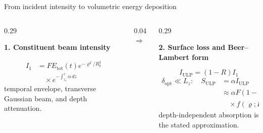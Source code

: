 \documentclass[aspectratio=169,10pt]{beamer}
\begin{document}
\begin{frame}[t]{From incident intensity to volumetric energy deposition}
  \hypertarget{supp:physics-source-hierarchy}{}
  \vspace{-0.12cm}\hspace{0.65cm}
  \hspace{0.10cm}\GVBackupIndexButton
  \vspace{0.02cm}
  \begin{columns}[T,onlytextwidth]
    \setlength{\columnsep}{0pt}
    \begin{column}{0.29\textwidth}
      \raggedright\scriptsize\textbf{\color{GVSourceBlue}1. Constituent beam intensity}\par
      \vspace{0.11cm}
      \[
      \begin{aligned}
      I_1&=F E_{\mathrm{tot}}(t)e^{-\varrho^2/R_0^2}\\[-0.05cm]
      &\quad\times e^{-\int_{z_s}^{z}\alpha\,dz}
      \end{aligned}
      \]
      \vspace{-0.11cm}
      \scriptsize temporal envelope, transverse Gaussian beam, and depth attenuation.
    \end{column}
    \begin{column}{0.04\textwidth}
      \centering\vspace{0.82cm}\textcolor{GVTeal}{\(\Longrightarrow\)}
    \end{column}
    \begin{column}{0.29\textwidth}
      \raggedright\scriptsize\textbf{\color{GVSourceBlue}2. Surface loss and Beer--Lambert form}\par
      \vspace{0.11cm}
      \[
      I_{\mathrm{ULP}}=(1-R)I_1
      \]
      \vspace{-0.23cm}
      \[
      \begin{aligned}
      \delta_{\mathrm{opt}}\ll L_z:\quad
      S_{\mathrm{ULP}}&=\alpha I_{\mathrm{ULP}}\\[-0.08cm]
      &\approx\alpha F(1-R)E_{\mathrm{tot}}\\[-0.08cm]
      &\quad\times f(\varrho;R_0)e^{-\alpha(z-z_s)}
      \end{aligned}
      \]
      \vspace{-0.10cm}
      \scriptsize depth-independent absorption is the stated approximation.

\end{column}
\end{columns}
\end{frame}
\end{document}

